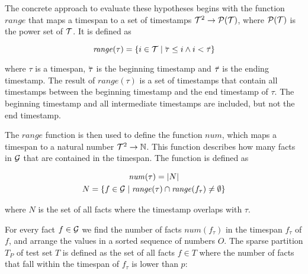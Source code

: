 The concrete approach to evaluate these hypotheses begins with the function $\mathit{range}$ that maps a timespan to a set of timestamps $\mathcal{T}^2 \rightarrow \mathcal{P}(\mathcal{T})$, where $\mathcal{P}(\mathcal{T})$ is the power set of $\mathcal{T}$. 
It is defined as

\begin{equation}
\mathit{range}(\tau) = \{ i \in \varT \mid \timebegin{\tau} \leq i \wedge i < \timeend{\tau} \}
\end{equation}

\noindent
where $\tau$ is a timespan, $\timebegin{\tau}$ is the beginning timestamp and $\timeend{\tau}$ is the ending timestamp.
The result of $\mathit{range}(\tau)$ is a set of timestamps that contain all timestamps between the beginning timestamp and the end timestamp of $\tau$. The beginning timestamp and all intermediate timestamps are included, but not the end timestamp.

The $\mathit{range}$ function is then used to define the function $\mathit{num}$, which maps a timespan to a natural number $\mathcal{T}^2 \rightarrow \mathbb{N}$. This function describes how many facts in $\mathcal{G}$ that are contained in the timespan. The function is defined as

\begin{equation}
\begin{gathered}
\mathit{num}(\tau) = | N |\\
N = \{ f \in \mathcal{G} \mid \mathit{range}(\tau) \cap \mathit{range}(f_\tau) \neq \emptyset \}
\end{gathered}
\end{equation}

\noindent
where $N$ is the set of all facts where the timestamp overlaps with $\tau$.

For every fact $f \in \mathcal{G}$ we find the number of facts $\mathit{num}(f_\tau)$ in the timespan $f_\tau$ of $f$, and arrange the values in a sorted sequence of numbers $O$.
The sparse partition $T_P$ of test set $T$ is defined as the set of all facts $f \in T$ where the number of facts that fall within the timespan of $f_\tau$ is lower than $p$:



